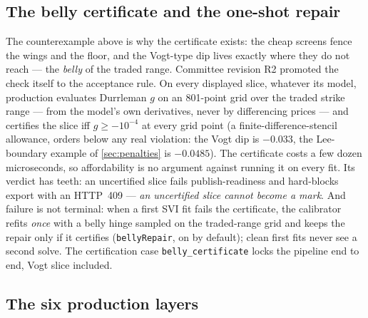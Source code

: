 \documentclass[11pt]{article}
\begin{document}
\subsection{The belly certificate and the one-shot repair}
\label{sec:certificate}

The counterexample above is why the certificate exists: the cheap screens
fence the wings and the floor, and the Vogt-type dip lives exactly where they
do not reach --- the \emph{belly} of the traded range. Committee revision R2
promoted the check itself to the acceptance rule. On every displayed slice,
whatever its model, production evaluates Durrleman $g$ on an 801-point grid
over the traded strike range --- from the model's own derivatives, never by
differencing prices --- and certifies the slice iff $g\ge-10^{-4}$ at every
grid point (a finite-difference-stencil allowance, orders below any real
violation: the Vogt dip is $-0.033$, the Lee-boundary example of
\cref{sec:penalties} is $-0.0485$). The certificate costs a few dozen
microseconds, so affordability is no argument against running it on every
fit. Its verdict has teeth: an uncertified slice fails publish-readiness and
hard-blocks export with an HTTP~409 --- \emph{an uncertified slice cannot
become a mark}. And failure is not terminal: when a first SVI fit fails the
certificate, the calibrator refits \emph{once} with a belly hinge sampled on
the traded-range grid and keeps the repair only if it certifies
(\texttt{bellyRepair}, on by default); clean first fits never see a second
solve. The certification case \texttt{belly\_certificate} locks the pipeline
end to end, Vogt slice included.

\subsection{The six production layers}
\label{sec:layers}
\end{document}
